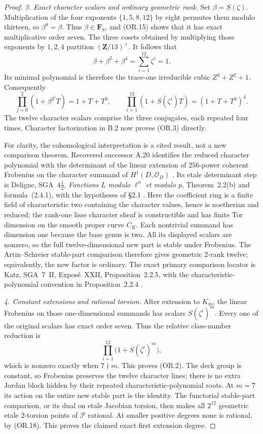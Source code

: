 \documentclass[11pt,a4paper]{article}
\begin{document}
\begin{proof}
\emph{3. Exact character scalars and ordinary geometric rank.}
Set $\beta=S(\zeta)$.  Multiplication of the four exponents
$\{1,5,8,12\}$ by eight permutes them modulo thirteen, so
$\beta^8=\beta$.  Thus $\beta\in\mathbf F_8$, and (OR.15)
shows that it has exact multiplicative order seven.
The three cosets obtained by multiplying those exponents by
$1,2,4$ partition $(\mathbf Z/13)^\times$.  It follows that
\[
              \beta+\beta^2+\beta^4
                        =\sum_{i=1}^{12}\zeta^i=1.
 \tag{OR.16}
\]
Its minimal polynomial is therefore the trace-one irreducible
cubic $Z^3+Z^2+1$.  Consequently
\[
 \prod_{j=0}^{2}(1+\beta^{2^j}T)=1+T+T^3,
 \qquad
 \prod_{i=1}^{12}(1+S(\zeta^i)T)=(1+T+T^3)^4.
 \tag{OR.17}
\]
The twelve character scalars comprise the three conjugates,
each repeated four times.  Character factorization in B.2
now proves (OR.3) directly.

For clarity, the cohomological interpretation is a cited result,
not a new comparison theorem.  Recovered successor A.20 identifies
the reduced character polynomial with the determinant of the
linear extension of $256$-power coherent Frobenius on the
character summand of $H^1(D,\mathcal O_D)$
\cite[A.20]{ASrun}.  Its etale determinant step is Deligne,
SGA~$4\frac12$, \emph{Fonctions $L$ modulo $\ell^n$ et modulo
$p$}, Theorem~2.2(b) and formula~(2.4.1), with the hypotheses
of \S2.1 \cite{DeligneModP}.  Here the coefficient ring is a
finite field of characteristic two containing the character
values, hence is noetherian and reduced; the rank-one lisse
character sheaf is constructible and has finite Tor dimension
on the smooth proper curve $C_K$.  Each nontrivial summand has dimension one
because the base genus is two.  All its displayed scalars are
nonzero, so the full twelve-dimensional new part is stable under
Frobenius.  The Artin--Schreier stable-part comparison therefore
gives geometric $2$-rank twelve; equivalently, the new factor is
ordinary.  The exact primary comparison locator is Katz,
SGA~7~II, Expos\'e~XXII, Proposition~2.2.5, with the
characteristic-polynomial convention in Proposition~2.2.4
\cite{KatzCongruence}.

\emph{4. Constant extensions and rational torsion.}
After extension to $K_m$, the linear Frobenius on those
one-dimensional summands has scalars $S(\zeta^i)^m$.
Every one of the original scalars has exact order seven.
Thus the relative class-number reduction is
\[
        \prod_{i=1}^{12}\bigl(1+S(\zeta^i)^m\bigr),
 \tag{OR.18}
\]
which is nonzero exactly when $7\nmid m$.  This proves (OR.2).
The deck group is constant, so Frobenius preserves the twelve
character lines; there is no extra Jordan block hidden by their
repeated characteristic-polynomial roots.  At $m=7$ its action
on the entire new stable part is the identity.  The functorial
stable-part comparison, or its dual on etale Jacobian torsion,
then makes all $2^{12}$ geometric etale $2$-torsion points of
$\mathcal P$ rational.  At smaller positive degrees none is
rational, by (OR.18).  This proves the claimed exact first
extension degree.
\end{proof}
\end{document}
